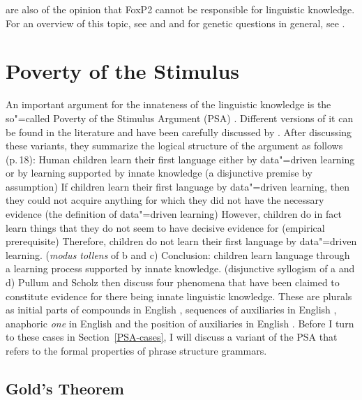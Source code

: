\citet*[]{FHC2005a} are also of the opinion that FoxP2 cannot be responsible for linguistic knowledge. For an overview of this topic,
see  and  and for genetic questions in general, see . 

\section{Poverty of the Stimulus}
\label{Abschnitt-PSA}


An important argument for the innateness of the linguistic knowledge is the so"=called
Poverty of the Stimulus Argument (PSA) \citep[]{Chomsky80b-u}. Different versions of it can be found in the literature and have been carefully discussed
by \citet{PS2002a}. After discussing these variants, they summarize the logical structure of the
argument as follows (p.\,18):
\eal
\ex Human children learn their first language either by data"=driven learning or by learning supported by innate knowledge (a disjunctive premise by assumption)
\ex If children learn their first language by data"=driven learning, then they could not acquire anything for which they did not have the necessary evidence
(the definition of data"=driven learning)
\ex However, children do in fact learn things that they do not seem to have decisive evidence for (empirical prerequisite)
\ex Therefore, children do not learn their first language by data"=driven learning. (\emph{modus tollens} of b and c)
\ex Conclusion: children learn language through a learning process supported by innate knowledge. (disjunctive syllogism of a and d)
\zl
Pullum and Scholz then discuss four phenomena that have been claimed to constitute evidence for there being innate linguistic knowledge.
These are plurals as initial parts of compounds in English \citep{Gordon86a}, sequences of auxiliaries in English
\citep{Kimball73b-u}, anaphoric \emph{one} in English \citep{Baker78a-u} and the position of auxiliaries in English \citep[--33]{Chomsky71a-u}.
Before I turn to these cases in Section~\ref{PSA-cases}, I will discuss a variant of the PSA that refers to the formal properties of
phrase structure grammars.

\subsection{Gold's Theorem}
\label{Abschnitt-Golds-Theorem}

